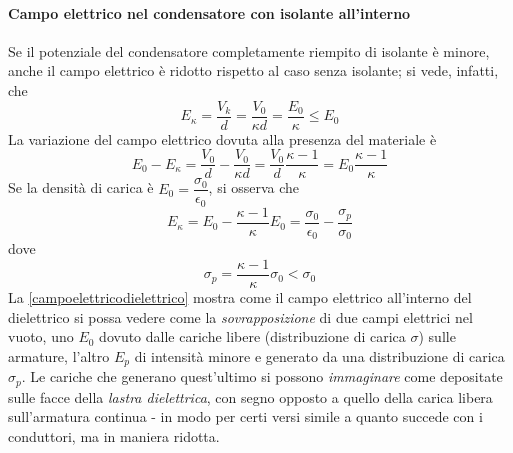 \paragraph{Campo elettrico nel condensatore con isolante all'interno}
Se il potenziale del condensatore completamente riempito di isolante è minore, anche il campo elettrico è ridotto rispetto al caso senza isolante; si vede, infatti, che
\begin{equation*}
	E_{\kappa}=\frac{V_k}{d}=\frac{V_0}{\kappa d}=\frac{E_0}{\kappa}\leq E_0
\end{equation*} 
La variazione del campo elettrico dovuta alla presenza del materiale è
\begin{equation*}
	E_0-E_{\kappa}=\frac{V_0}{d}-\frac{V_0}{\kappa d}=\frac{V_0}{d}\frac{\kappa-1}{\kappa}=E_0\frac{\kappa - 1}{\kappa}
\end{equation*}
Se la densità di carica è $E_0=\dfrac{\sigma_0}{\epsilon_0}$, si osserva che 
\begin{equation}\label{campoelettricodielettrico}
	E_{\kappa}=E_0-\frac{\kappa-1}{\kappa}E_0=\frac{\sigma_0}{\epsilon_0}-\frac{\sigma_p}{\sigma_0}
\end{equation}
dove
\begin{equation}
	\sigma_p=\frac{\kappa-1}{\kappa}\sigma_0<\sigma_0
\end{equation}
La \eqref{campoelettricodielettrico} mostra come il campo elettrico all'interno del dielettrico si possa vedere come la \textit{sovrapposizione} di due campi elettrici nel vuoto, uno $E_0$ dovuto dalle cariche libere (distribuzione di carica $\sigma$) sulle armature, l'altro $E_p$ di intensità minore e generato da una distribuzione di carica $\sigma_p$. Le cariche che generano quest'ultimo si possono \textit{immaginare} come depositate sulle facce della \textit{lastra dielettrica}, con segno opposto a quello della carica libera sull'armatura continua - in modo per certi versi simile a quanto succede con i conduttori, ma in maniera ridotta.
